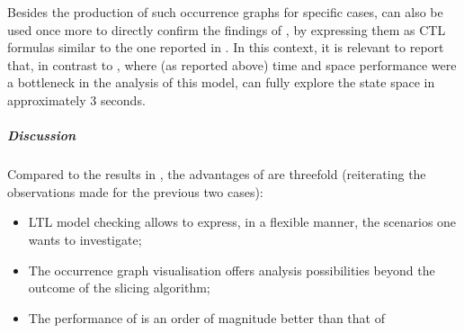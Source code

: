 \medskip\noindent Besides the production of such occurrence graphs for specific cases, \GROOVE can also be used once more to directly confirm the findings of \cite[Figs. 8 and~9]{datamod2023}, by expressing them as CTL formulas similar to the one reported in . In this context, it is relevant to report that, in contrast to \BioResolve, where (as reported above) time and space performance were a bottleneck in the analysis of this model, \GROOVE can fully explore the state space in approximately 3 seconds.

\subparagraph*{Discussion}

Compared to the results in \cite{datamod2023}, the advantages of \GROOVE are threefold (reiterating the observations made for the previous two cases):
%
\begin{itemize}
\item LTL model checking allows to express, in a flexible manner, the scenarios one wants to investigate;
\item The occurrence graph visualisation offers analysis possibilities beyond the outcome of the slicing algorithm;
\item The performance of \GROOVE is an order of magnitude better than that of \BioResolve
\end{itemize}


